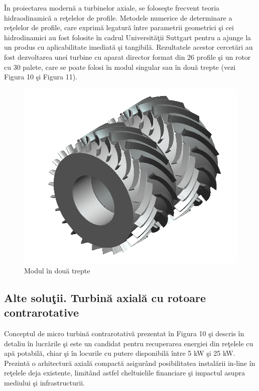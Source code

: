 \^{I}n proiectarea modern\u{a} a turbinelor axiale, se folose\c{s}te frecvent teoria hidraodinamic\u{a} a re\c{t}elelor de profile. Metodele numerice de determinare a re\c{t}elelor de profile, care exprim\u{a} legatur\u{a} \^{i}ntre parametrii geometrici \c{s}i cei hidrodinamici au fost folosite \^{i}n cadrul Universit\u{a}\c{t}ii Suttgart pentru a ajunge la un produs cu aplicabilitate imediat\u{a} \c{s}i tangibil\u{a}. Rezultatele acestor cercet\u{a}ri au fost dezvoltarea unei turbine cu aparat director format din 26 profile \c{s}i un rotor cu 30 palete, care se poate folosi \^{i}n modul singular sau \^{i}n dou\u{a} trepte (vezi Figura 10 \c{s}i Figura 11).

\begin{figure}[h!]
	\centering
	\includegraphics[scale=0.6]{figures/modul_in_doua_trepte.png}
	\caption{Modul \^{i}n dou\u{a} trepte \cite{susanhub}}
	\label{Modul \^{i}n dou\u{a} trepte}
\end{figure}



\subsection{Alte solu\c{t}ii. Turbin\u{a} axial\u{a} cu rotoare contrarotative}

Conceptul de micro turbin\u{a} contrarotativ\u{a} prezentat \^{i}n Figura 10 \c{s}i descris \^{i}n detaliu \^{i}n lucr\u{a}rile \cite{andolfatto2016simulation} \c{s}i \cite{andolfatto2015mixed} este un candidat pentru recuperarea energiei din re\c{t}elele cu ap\u{a} potabil\u{a}, chiar \c{s}i \^{i}n locurile cu putere disponibil\u{a} \^{i}ntre 5 kW \c{s}i 25 kW. Prezint\u{a} o arhitectur\u{a} axial\u{a} compact\u{a} asigur\^{a}nd posibilitatea instal\u{a}rii in-line \^{i}n re\c{t}elele deja existente, limit\^{a}nd astfel cheltuielile financiare \c{s}i impactul asupra mediului \c{s}i infrastructurii.

